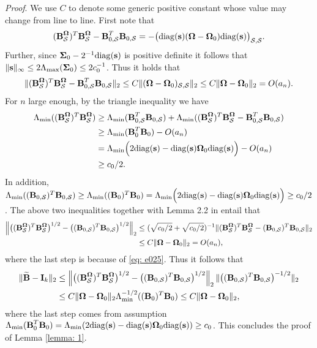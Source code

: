 \documentclass[11pt]{article}
\newcommand{\bs}{\mbox{\bf s}}
\newcommand{\bB}{\mbox{\bf B}}
\newcommand{\bI}{\mbox{\bf I}}
\newcommand{\bOmg}{\mbox{\boldmath $\Omega$}}
\newcommand{\wt}{\widetilde}
\newcommand{\sbOmg}{\mbox{\scriptsize\boldmath $\Omega$}}
\newcommand{\Sig}{\mathbf{\Sigma}}
\newcommand{\diag}{\mathrm{diag}}
\begin{document}
\noindent \textit{Proof}. We use $C$ to denote some generic positive constant whose value may change from line to line.  First note that
\begin{align}\label{eq: e025}
(\bB^{\sbOmg}_\mathcal{S})^T\bB^{\sbOmg}_\mathcal{S} - \bB_{0,\mathcal{S}}^T\bB_{0,\mathcal{S}} = - \big(\diag(\bs)(\bOmg-\bOmg_0)\diag(\bs)\big)_{\mathcal{S},\mathcal{S}}.
\end{align}
Further, since $\Sig_0 - 2^{-1}\diag(\bs) $ is positive definite it follows that $\|\bs\|_\infty \leq 2\Lambda_{\max}(\Sig_0) \leq 2c_0^{-1}$. Thus it holds that
\begin{align*}
\|(\bB^{\sbOmg}_\mathcal{S})^T\bB^{\sbOmg}_\mathcal{S} - \bB_{0,\mathcal{S}}^T\bB_{0,\mathcal{S}}\|_2 \leq C\|(\bOmg-\bOmg_0)_{\mathcal{S},\mathcal{S}}\|_2 \leq C \|\bOmg-\bOmg_0\|_2=O(a_{n}).
\end{align*}
For $n$ large enough, by the triangle inequality we have
\begin{align*}
 \Lambda_{\min}((\bB^{\sbOmg}_\mathcal{S})^T\bB^{\sbOmg}_\mathcal{S} ) & \geq \Lambda_{\min}(\bB_{0,\mathcal{S}}^T\bB_{0,\mathcal{S}} ) + \Lambda_{\min}((\bB^{\sbOmg}_\mathcal{S})^T\bB^{\sbOmg}_\mathcal{S}-\bB_{0,\mathcal{S}}^T\bB_{0,\mathcal{S}} ) \\
& \geq \Lambda_{\min}(\bB_{0}^T\bB_{0} ) - O(a_{n}) \\
& = \Lambda_{\min}\Big(2 \diag(\bs) - \diag(\bs)\bOmg_0\diag(\bs) \Big) - O(a_{n})\\
&\geq c_0/2.
\end{align*}
In addition, $ \Lambda_{\min}((\bB_{0,\mathcal{S}})^T\bB_{0,\mathcal{S}}) \geq \Lambda_{\min}((\bB_{0})^T\bB_{0}) = \Lambda_{\min}\Big(2 \diag(\bs) - \diag(\bs)\bOmg_0\diag(\bs) \Big) \geq c_0/2$. The above two inequalities together with Lemma 2.2 in \cite{schmitt1992perturbation} entail that
\begin{align}
\nonumber\left\|\big((\bB^{\sbOmg}_\mathcal{S})^T\bB^{\sbOmg}_\mathcal{S} \big)^{1/2} - \big((\bB_{0,\mathcal{S}})^T\bB_{0,\mathcal{S}}\big)^{1/2} \right\|_2 & \leq (\sqrt{c_0/2} + \sqrt{c_0/2})^{-1}\|(\bB^{\sbOmg}_\mathcal{S})^T\bB^{\sbOmg}_\mathcal{S} - (\bB_{0,\mathcal{S}})^T\bB_{0,\mathcal{S}} \|_2 \\
& \leq C \|\bOmg - \bOmg_0\|_2= O(a_{n}),
\end{align}
where the last step is because of \eqref{eq: e025}. Thus it follows that
\begin{align}\label{eq: e054}
\nonumber \|\wt{\bB} - \bI_k\|_2 &\leq  \left\|\big((\bB^{\sbOmg}_\mathcal{S})^T\bB^{\sbOmg}_\mathcal{S} \big)^{1/2} - \big((\bB_{0,\mathcal{S}})^T\bB_{0,\mathcal{S}}\big)^{1/2} \right\|_2 \|\big((\bB_{0,\mathcal{S}})^T\bB_{0,\mathcal{S}}\big)^{-1/2}\|_2 \\
& \leq C \|\bOmg - \bOmg_0\|_2 \Lambda_{\min}^{-1/2}( (\bB_{0})^T\bB_{0}  ) \leq C\|\bOmg - \bOmg_0\|_2 ,
\end{align}
where the last step comes from assumption $\Lambda_{\min}(\bB_{0}^T\bB_0)= \Lambda_{\min}(2\diag(\bs) - \diag(\bs)\bOmg_0\diag(\bs)) \\ \geq c_0$.  This concludes the proof of Lemma \ref{lemma: 1}.
\end{document}
